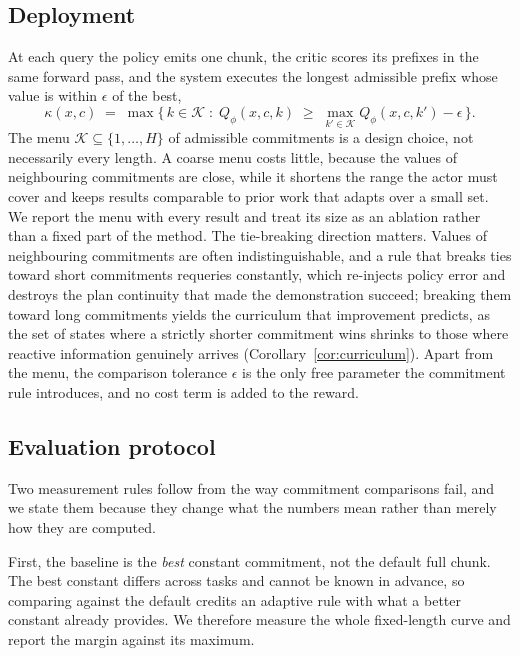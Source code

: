 \subsection{Deployment}
\label{sec:method:deploy}

At each query the policy emits one chunk, the critic scores its prefixes in the same forward pass,
and the system executes the longest admissible prefix whose value is within $\epsilon$ of the best,
\begin{equation}
\label{eq:method-kappa}
\kappa(x, c) \;=\; \max\Big\{\,k \in \mathcal K \;:\; Q_\phi(x, c, k) \;\ge\;
\max_{k' \in \mathcal K} Q_\phi(x, c, k') - \epsilon \,\Big\}.
\end{equation}
The menu $\mathcal K \subseteq \{1,\dots,H\}$ of admissible commitments is a design choice, not
necessarily every length. A coarse menu costs little, because the values of neighbouring
commitments are close, while it shortens the range the actor must cover and keeps results
comparable to prior work that adapts over a small set. We report the menu with every result and
treat its size as an ablation rather than a fixed part of the method.
The tie-breaking direction matters. Values of neighbouring commitments are often
indistinguishable, and a rule that breaks ties toward short commitments requeries constantly, which
re-injects policy error and destroys the plan continuity that made the demonstration succeed;
breaking them toward long commitments yields the curriculum that improvement predicts, as the set
of states where a strictly shorter commitment wins shrinks to those where reactive information
genuinely arrives (Corollary~\ref{cor:curriculum}). Apart from the menu, the comparison tolerance
$\epsilon$ is the only free parameter the commitment rule introduces, and no cost term is added to
the reward.

\subsection{Evaluation protocol}
\label{sec:method:protocol}

Two measurement rules follow from the way commitment comparisons fail, and we state them because
they change what the numbers mean rather than merely how they are computed.

First, the baseline is the \emph{best} constant commitment, not the default full chunk. The best
constant differs across tasks and cannot be known in advance, so comparing against the default
credits an adaptive rule with what a better constant already provides. We therefore measure the
whole fixed-length curve and report the margin against its maximum.

